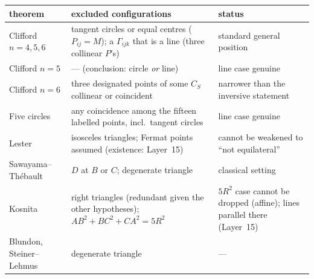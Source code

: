 \documentclass[11pt]{article}
\theoremstyle{definition}
\theoremstyle{remark}
\begin{document}
\begin{center}\small
\begin{tabular}{p{2.6cm}p{6.2cm}p{5.2cm}}
\toprule
theorem & excluded configurations & status\\
\midrule
Clifford $n=4,5,6$ & tangent circles or equal centres ($P_{ij}=M$); a $\Gamma_{ijk}$ that is a line
(three collinear $P$'s) & standard general position\\
Clifford $n=5$ & --- (conclusion: circle \emph{or} line) & line case genuine\\
Clifford $n=6$ & three designated points of some $C_S$ collinear or coincident & narrower than the inversive statement\\
Five circles & any coincidence among the fifteen labelled points, incl.\ tangent circles & line case genuine\\
Lester & isosceles triangles; Fermat points assumed (existence: Layer~15) & cannot be weakened to ``not equilateral''\\
Sawayama--Th\'ebault & $D$ at $B$ or $C$; degenerate triangle & classical setting\\
Kosnita & right triangles (redundant given the other hypotheses); $AB^2+BC^2+CA^2=5R^2$ & $5R^2$ case cannot be dropped (affine); lines parallel there (Layer~15)\\
Blundon, Steiner--Lehmus & degenerate triangle & ---\\
\bottomrule
\end{tabular}
\end{center}
\end{document}
